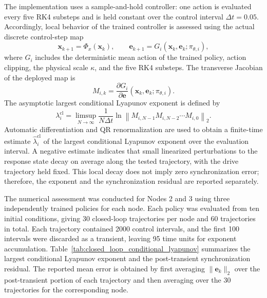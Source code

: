 \documentclass[a4paper,fleqn]{cas-dc}
\theoremstyle{plain}
\theoremstyle{definition}
\begin{document}
The implementation uses a sample-and-hold controller: one action is evaluated every five RK4 substeps and is held constant over the control interval $\Delta t=0.05$. Accordingly, local behavior of the trained controller is assessed using the actual discrete control-step map
\begin{equation}
	\mathbf{x}_{k+1}=\Phi_x(\mathbf{x}_k),
	\qquad
	\mathbf{e}_{k+1}=G_i(\mathbf{x}_k,\mathbf{e}_k;\pi_{\theta,i}),
	\label{eq:sampled_closed_loop_map}
\end{equation}
where $G_i$ includes the deterministic mean action of the trained policy, action clipping, the physical scale $\kappa$, and the five RK4 substeps. The transverse Jacobian of the deployed map is
\begin{equation}
	M_{i,k}
	=
	\frac{\partial G_i}{\partial\mathbf{e}}
	(\mathbf{x}_k,\mathbf{e}_k;\pi_{\theta,i}).
	\label{eq:sampled_error_jacobian}
\end{equation}
The asymptotic largest conditional Lyapunov exponent is defined by
\begin{equation}
	\lambda_i^{\mathrm{cl}}
	=
	\limsup_{N\to\infty}
	\frac{1}{N\Delta t}
	\ln
	\left\|
	M_{i,N-1}M_{i,N-2}\cdots M_{i,0}
	\right\|_2.
	\label{eq:closed_loop_conditional_lyapunov}
\end{equation}
Automatic differentiation and QR renormalization are used to obtain a finite-time estimate $\widehat\lambda_i^{\mathrm{cl}}$ of the largest conditional Lyapunov exponent over the evaluation interval. A negative estimate indicates that small linearized perturbations to the response state decay on average along the tested trajectory, with the drive trajectory held fixed. This local decay does not imply zero synchronization error; therefore, the exponent and the synchronization residual are reported separately.

The numerical assessment was conducted for Nodes 2 and 3 using three independently trained policies for each node. Each policy was evaluated from ten initial conditions, giving 30 closed-loop trajectories per node and 60 trajectories in total. Each trajectory contained 2000 control intervals, and the first 100 intervals were discarded as a transient, leaving 95 time units for exponent accumulation. Table~\ref{tab:closed_loop_conditional_lyapunov} summarizes the largest conditional Lyapunov exponent and the post-transient synchronization residual. The reported mean error is obtained by first averaging $\|\mathbf{e}_k\|_2$ over the post-transient portion of each trajectory and then averaging over the 30 trajectories for the corresponding node.
\end{document}
